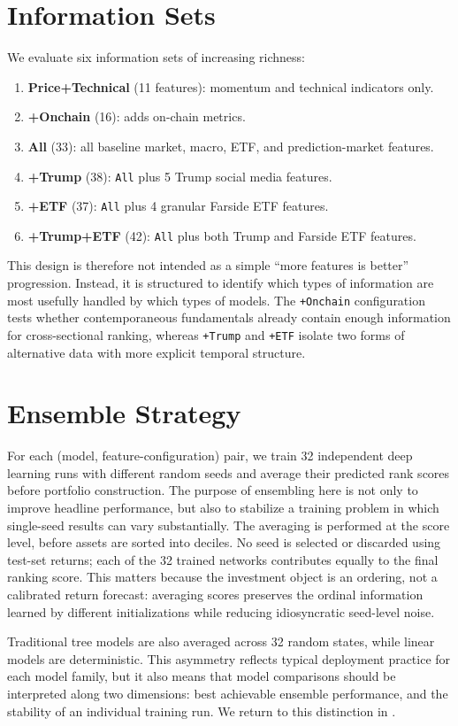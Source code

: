 \section{Information Sets}

We evaluate six information sets of increasing richness:

\begin{enumerate}
  \item \textbf{Price+Technical} (11 features): momentum and technical indicators only.
  \item \textbf{+Onchain} (16): adds on-chain metrics.
  \item \textbf{All} (33): all baseline market, macro, ETF, and prediction-market features.
  \item \textbf{+Trump} (38): \texttt{All} plus 5 Trump social media features.
  \item \textbf{+ETF} (37): \texttt{All} plus 4 granular Farside ETF features.
  \item \textbf{+Trump+ETF} (42): \texttt{All} plus both Trump and Farside ETF features.
\end{enumerate}

This design is therefore not intended as a simple ``more features is better''
progression.
Instead, it is structured to identify which types of information are most
usefully handled by which types of models.
The \texttt{+Onchain} configuration tests whether contemporaneous
fundamentals already contain enough information for cross-sectional ranking,
whereas \texttt{+Trump} and \texttt{+ETF} isolate two forms of
alternative data with more explicit temporal structure.

\section{Ensemble Strategy}

For each (model, feature-configuration) pair, we train 32 independent deep
learning runs with different random seeds and average their predicted rank
scores before portfolio construction.
The purpose of ensembling here is not only to improve headline performance,
but also to stabilize a training problem in which single-seed results can
vary substantially.
The averaging is performed at the score level, before assets are sorted into
deciles.
No seed is selected or discarded using test-set returns; each of the 32
trained networks contributes equally to the final ranking score.
This matters because the investment object is an ordering, not a calibrated
return forecast: averaging scores preserves the ordinal information learned
by different initializations while reducing idiosyncratic seed-level noise.

Traditional tree models are also averaged across 32 random states, while
linear models are deterministic.
This asymmetry reflects typical deployment practice for each model family,
but it also means that model comparisons should be interpreted along two
dimensions: best achievable ensemble performance, and the stability of an
individual training run.
We return to this distinction in .
